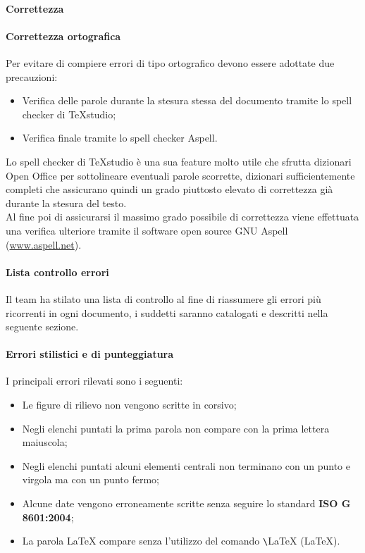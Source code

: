 \paragraph{Correttezza}
\paragraph{Correttezza ortografica}
Per evitare di compiere errori di tipo ortografico devono essere adottate due precauzioni:
\begin{itemize}
\item Verifica delle parole durante la stesura stessa del documento tramite lo spell checker di TeXstudio;
\item Verifica finale tramite lo spell checker Aspell.
\end{itemize}
Lo spell checker di TeXstudio è una sua feature molto utile che sfrutta dizionari Open Office per sottolineare eventuali parole scorrette, dizionari sufficientemente completi che assicurano quindi un grado piuttosto elevato di correttezza già durante la stesura del testo. \\
Al fine poi di assicurarsi il massimo grado possibile di correttezza viene effettuata una verifica ulteriore tramite il software open source GNU Aspell
(\href{http://www.aspell.net/}{www.aspell.net}).
 
\paragraph{Lista controllo errori}
Il team ha stilato una lista di controllo al fine di riassumere gli errori più ricorrenti in ogni documento, i suddetti saranno catalogati e descritti nella seguente sezione.
\paragraph{Errori stilistici e di punteggiatura}
I principali errori rilevati sono i seguenti:
\begin{itemize}
\item Le figure di rilievo non vengono scritte in corsivo;
\item Negli elenchi puntati la prima parola non compare con la prima lettera maiuscola;
\item Negli elenchi puntati alcuni elementi centrali non terminano con un punto e virgola ma con un punto fermo;
\item Alcune date vengono erroneamente scritte senza seguire lo standard \textbf{ISO G 8601:2004};
\item La parola LaTeX compare senza l'utilizzo del comando \verb+\+LaTeX (\LaTeX).
\end{itemize}

